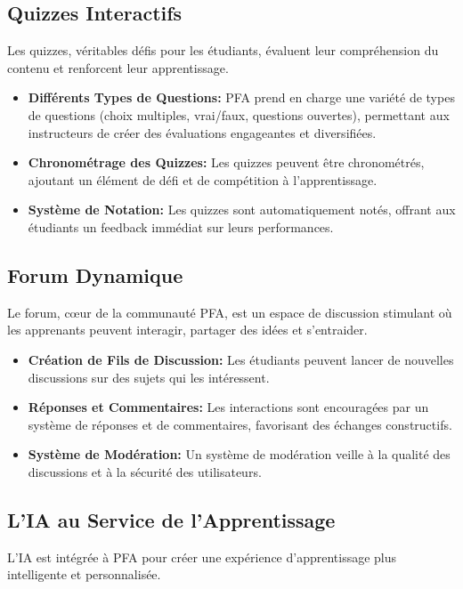 \subsection{Quizzes Interactifs}

Les quizzes, véritables défis pour les étudiants, évaluent leur compréhension du contenu et renforcent leur apprentissage.

\begin{itemize}
    \item \textbf{Différents Types de Questions:} PFA prend en charge une variété de types de questions (choix multiples, vrai/faux, questions ouvertes), permettant aux instructeurs de créer des évaluations engageantes et diversifiées.
    \item \textbf{Chronométrage des Quizzes:} Les quizzes peuvent être chronométrés, ajoutant un élément de défi et de compétition à l'apprentissage.
    \item \textbf{Système de Notation:} Les quizzes sont automatiquement notés, offrant aux étudiants un feedback immédiat sur leurs performances.
\end{itemize}

\subsection{Forum Dynamique}

Le forum, cœur de la communauté PFA, est un espace de discussion stimulant où les apprenants peuvent interagir, partager des idées et s'entraider.

\begin{itemize}
    \item \textbf{Création de Fils de Discussion:} Les étudiants peuvent lancer de nouvelles discussions sur des sujets qui les intéressent.
    \item \textbf{Réponses et Commentaires:} Les interactions sont encouragées par un système de réponses et de commentaires, favorisant des échanges constructifs.
    \item \textbf{Système de Modération:} Un système de modération veille à la qualité des discussions et à la sécurité des utilisateurs.
\end{itemize}

\subsection{L'IA au Service de l'Apprentissage}

L'IA est intégrée à PFA pour créer une expérience d'apprentissage plus intelligente et personnalisée.


